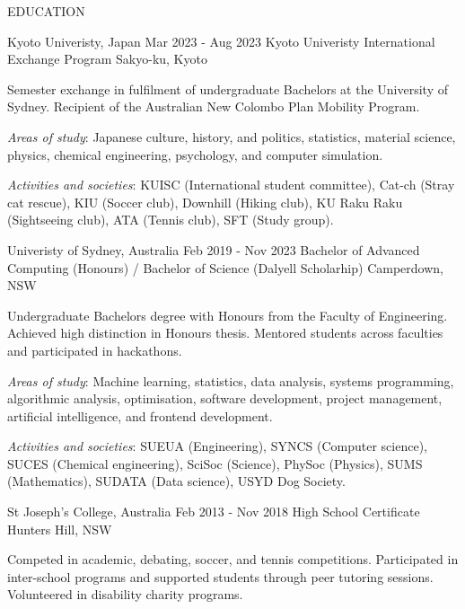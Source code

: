 
\begin{ResumeSection}{EDUCATION}

    \begin{DatedField}
        {Kyoto Univeristy, Japan}
        {Mar 2023 - Aug 2023}
        {Kyoto Univeristy International Exchange Program}
        {Sakyo-ku, Kyoto}
        \item Semester exchange in fulfilment of undergraduate Bachelors at the University of Sydney. Recipient of the Australian New Colombo Plan Mobility Program.
        \item \textit{Areas of study}: Japanese culture, history, and politics, statistics, material science, physics, chemical engineering, psychology, and computer simulation.
        \item \textit{Activities and societies}: KUISC (International student committee), Cat-ch (Stray cat rescue), KIU (Soccer club), Downhill (Hiking club), KU Raku Raku (Sightseeing club), ATA (Tennis club), SFT (Study group).
    \end{DatedField}

    \newpage

    \begin{DatedField}
        {Univeristy of Sydney, Australia}
        {Feb 2019 - Nov 2023}
        {Bachelor of Advanced Computing (Honours) / Bachelor of Science (Dalyell Scholarhip)}
        {Camperdown, NSW}
        \item Undergraduate Bachelors degree with Honours from the Faculty of Engineering. Achieved high distinction in Honours thesis. Mentored students across faculties and participated in hackathons.
        \item \textit{Areas of study}: Machine learning, statistics, data analysis, systems programming, algorithmic analysis, optimisation, software development, project management, artificial intelligence, and frontend development.
        \item \textit{Activities and societies}: SUEUA (Engineering), SYNCS (Computer science), SUCES (Chemical engineering), SciSoc (Science), PhySoc (Physics), SUMS (Mathematics), SUDATA (Data science), USYD Dog Society.
    \end{DatedField}

    \begin{DatedField}
        {St Joseph's College, Australia}
        {Feb 2013 - Nov 2018}
        {High School Certificate}
        {Hunters Hill, NSW}
        \item Competed in academic, debating, soccer, and tennis competitions. Participated in inter-school programs and supported students through peer tutoring sessions. Volunteered in disability charity programs.
    \end{DatedField}
    
\end{ResumeSection}